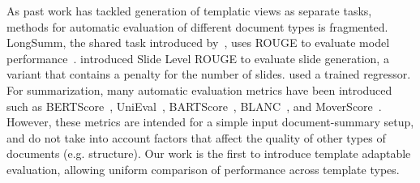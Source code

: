 As past work has tackled generation of templatic views as separate tasks, methods for automatic evaluation of different document types is fragmented. LongSumm, the shared task introduced by~\textcite{chandrasekaran2020overview}, uses ROUGE to evaluate model performance~\cite{lin2004rouge}. \textcite{Fu2021DOC2PPTAP} introduced Slide Level ROUGE to evaluate slide generation, a variant that contains a penalty for the number of slides. \textcite{Qiang2016LearningTG} used a trained regressor. For summarization, many automatic evaluation metrics have been introduced such as BERTScore~\cite{zhang2020bertscore}, UniEval~\cite{Zhong2022TowardsAU}, BARTScore~\cite{Yuan2021BARTScoreEG}, BLANC~\cite{vasilyev2020blanc}, and MoverScore~\cite{zhao2019moverscore}. However, these metrics are intended for a simple input document-summary setup, and do not take into account factors that affect the quality of other types of documents (e.g. structure). Our work is the first to introduce template adaptable evaluation, allowing uniform comparison of performance across template types.


